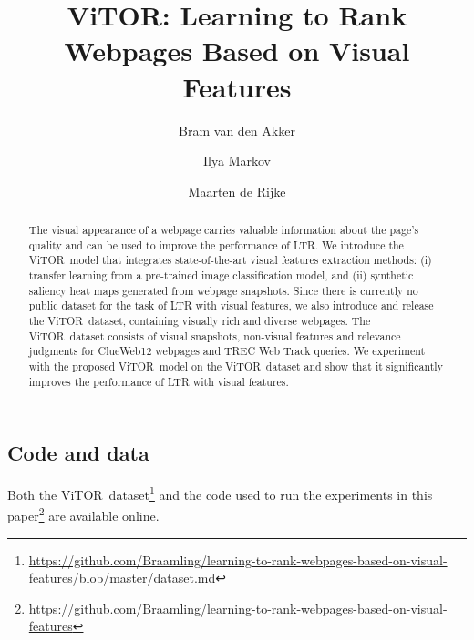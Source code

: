 \documentclass[sigconf,screen=true,natbib]{acmart}
\title{ViTOR: Learning to Rank Webpages Based on Visual Features}
\author{Bram van den Akker}
\affiliation{%
  \institution{University of Amsterdam}
  \city{Amsterdam} 
  \country{The Netherlands}
}
\author{Ilya Markov}
\affiliation{%
  \institution{University of Amsterdam}
  \city{Amsterdam} 
  \country{The Netherlands}  
}
\author{Maarten de Rijke}
\affiliation{%
   \institution{University of Amsterdam}
   \city{Amsterdam} 
   \country{The Netherlands}
}
\newcommand{\datasetname}{\ac{ViTOR}}
\newcommand{\modelname}{\ac{ViTOR}}
\begin{document}
%
%
\begin{abstract}
The visual appearance of a webpage carries valuable information about the page's quality and can be used to improve the performance of \ac{LTR}.
We introduce the \modelname~model that integrates state-of-the-art visual features extraction methods:
(i) transfer learning from a pre-trained image classification model, and
(ii) synthetic saliency heat maps generated from webpage snapshots.
Since there is currently no public dataset for the task of \ac{LTR} with visual features, we also introduce and release the \datasetname~dataset, containing visually rich and diverse webpages.
The \datasetname~dataset consists of visual snapshots, non-visual features and relevance judgments for ClueWeb12 webpages and TREC Web Track queries.
We experiment with the proposed \modelname~model on the \datasetname~dataset
and show that it significantly improves the performance of \ac{LTR} with visual features.
\end{abstract}





\maketitle










\subsection*{Code and data}

Both the \datasetname~dataset\footnote{\url{https://github.com/Braamling/learning-to-rank-webpages-based-on-visual-features/blob/master/dataset.md}} and the code used to run the experiments in this paper\footnote{\url{https://github.com/Braamling/learning-to-rank-webpages-based-on-visual-features}} are available online.
\end{document}
